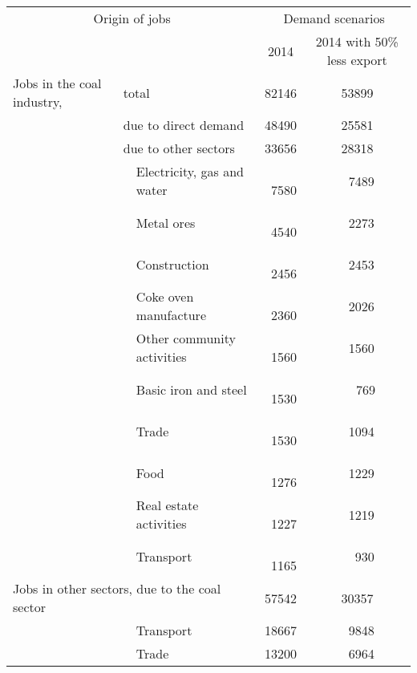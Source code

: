 \documentclass[12pt,english]{article}
\begin{document}
\begin{table}[ht]
	\centering
	\begin{tabular}{lp{20pt}lcc}
		\multicolumn{3}{c}{Origin of jobs} &\multicolumn{2}{c}{Demand scenarios}   \\ 
		\multicolumn{3}{c}{} & 2014 & 2014 with 50\% less export \\ 
		\midrule
		Jobs in the coal industry,	& \multicolumn{2}{l}{total}  & 82146 & 53899 \\ 
									& \multicolumn{2}{l}{due to direct demand}  & 48490 & 25581 \\ 

									& \multicolumn{2}{l}{due to other sectors}  & 33656 & 28318 \\ 
									& 	 & Electricity, gas and water & \,\ 7580  & \,\ 7489 \\ 
									&    & Metal ores& \,\ 4540  & \,\ 2273 \\ 
									&    & Construction& \,\ 2456  & \,\ 2453  \\ 														
									&    & Coke oven manufacture& \,\ 2360  & \,\ 2026   \\ 
									&    & Other community activities& \,\ 1560  & \,\ 1560   \\ 
									&    & Basic iron and steel & \,\ 1530  &  \,\ \,\ 769  \\
									&    & Trade & \,\ 1530  & \,\ 1094  \\ 
									&    & Food & \,\ 1276  & \,\ 1229 \\  
									&    & Real estate activities & \,\ 1227  & \,\ 1219 \\
									&    & Transport & \,\ 1165  & \,\ \, 930 \\  
		\midrule
		\multicolumn{3}{l}{Jobs in other sectors, due to the coal sector}  & 57542 &  30357 \\ 
							 		& 						 & Transport & 18667 &  \ \,9848 \\ 
							 		& 						 & Trade & 13200 &  \ \,6964 \\ 
		\bottomrule
	\end{tabular}
	\caption{}
\end{table}



\end{document}
